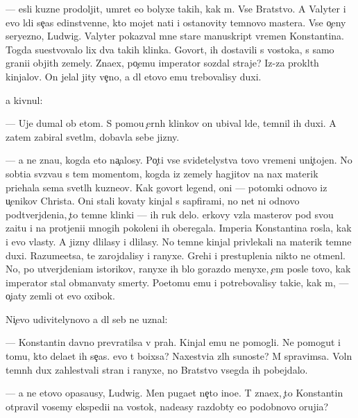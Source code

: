 \documentclass[10pt]{book}
\begin{document}
— {\Y}esli kuzne{\q} prodoljit, umret {\y}e{\x}o bolyxe takih, kak m{\yi}. Vse Bratstvo. A Valyter i {\y}evo l{\iu}di se{\y}{\c}as {\y}edinstvenn{\yi}{\y}e, kto mojet na{\y}ti i ostanovity temnovo mastera. Vse o{\c}eny seryezno, Ludwig. Valyter pokaz{\yi}val mne star{\yi}{\y}e manuskript{\yi} vremen Konstantina. Togda su{\x}estvovalo lix dva takih klinka. Govor{\ia}t, ih dostavili s vostoka, s samo{\y} grani{\q}i objit{\yi}h zemely. Zna{\y}ex, po{\c}emu imperator sozdal straje{\y}? Iz-za prokl{\ia}t{\yi}h kinjalov. On jelal jity ve{\c}no, a dl{\ia} etovo {\y}emu trebovalisy duxi.

{\Y}a kivnul:

— Uje dumal ob etom. S pomo{\x}{\y}u {\c}ern{\yi}h klinkov on ubival l{\iu}de{\y}, temnil ih duxi. A zatem zabiral svetl{\yi}m, dobavl{\ia}{\y}a sebe jizny.

— {\Y}a ne zna{\y}u, kogda eto na{\c}alosy. Po{\c}ti vse svidetelystva tovo vremeni uni{\c}tojen{\yi}. No sob{\yi}ti{\y}a sv{\ia}z{\yi}va{\y}u s tem momentom, kogda iz zemely hagjitov na nax materik pri{\y}ehala sem{\y}a svetl{\yi}h kuzne{\q}ov. Kak govor{\ia}t legend{\yi}, oni — potomki odnovo iz u{\c}enikov Christa. Oni stali kovaty kinjal{\yi} s sapfirami, no net ni odnovo podtverjdeni{\y}a, {\c}to temn{\yi}{\y}e klinki — ih ruk delo. {\Q}erkovy vz{\ia}la masterov pod svo{\y}u za{\x}itu i na prot{\ia}jeni{\y}i mnogih pokoleni{\y} ih oberegala. Imperi{\y}a Konstantina rosla, kak i {\y}evo vlasty. A jizny dlilasy i dlilasy. No temn{\yi}{\y}e kinjal{\yi} privlekali na materik temn{\yi}{\y}e duxi. Razume{\y}etsa, te zarojdalisy i ranyxe. Grehi i prestupleni{\y}a nikto ne otmen{\ia}l. No, po utverjdeni{\y}am istorikov, ranyxe ih b{\yi}lo gorazdo menyxe, {\c}em posle tovo, kak imperator stal obman{\yi}vaty smerty. Poetomu {\y}emu i potrebovalisy taki{\y}e, kak m{\yi}, — o{\c}i{\x}aty zemli ot {\y}evo oxibok.

Ni{\c}evo udivitelynovo {\y}a dl{\ia} seb{\ia} ne uznal:

— Konstantin davno prevratilsa v prah. Kinjal{\yi} {\y}emu ne pomogli. Ne pomogut i tomu, kto dela{\y}et ih se{\y}{\c}as. {\C}evo t{\yi} bo{\y}ixsa? Naxestvi{\y}a zl{\yi}h su{\x}noste{\y}? M{\yi} spravimsa. Voln{\yi} temn{\yi}h dux zahlest{\yi}vali stran{\yi} i ranyxe, no Bratstvo vsegda ih pobejdalo.

— {\Y}a ne etovo opasa{\y}usy, Ludwig. Men{\ia} puga{\y}et ne{\c}to ino{\y}e. T{\yi} zna{\y}ex, {\c}to Konstantin otpravil vosemy ekspedi{\q}i{\y} na vostok, nade{\y}asy razdob{\yi}ty {\y}e{\x}o podobnovo oruji{\y}a?
\end{document}
